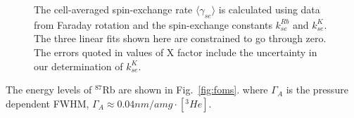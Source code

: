 \documentclass[pdftex,letterpaper,12pt]{report}
\begin{document}
\begin{figure}[t!]
	\label{hotrelaxation}
	\centering
	\caption{{The cell-averaged spin-exchange rate $\langle\gamma_{se}\rangle$ is calculated using data from Faraday rotation and the spin-exchange constants $k_{se}^{Rb}$ and $k_{se}^{K}$. The three linear fits shown here are constrained to go through zero. The errors quoted in values of X factor include the uncertainty in our determination of $k_{se}^{K}$.}}
\end{figure}
	
The energy levels of $^{87}$Rb are shown in Fig.~\ref{fig:foms}.
where $\Gamma_{A}$ is the pressure dependent FWHM, $\Gamma_{A}\approx 0.04nm/amg \cdot [^{3}He]$.


\end{document}
